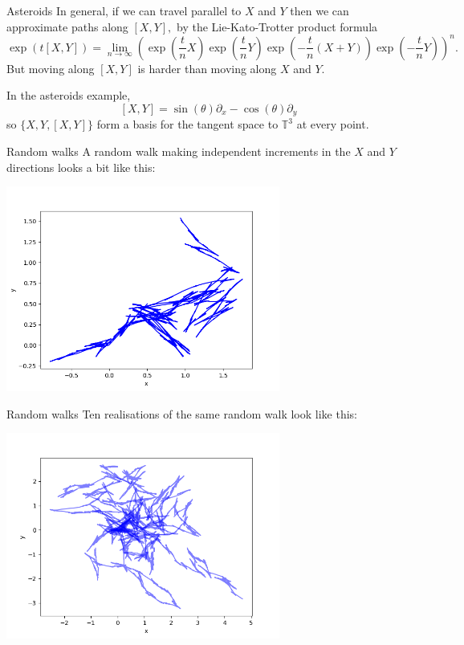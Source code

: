 \documentclass{beamer}
\numberwithin{equation}{section}
\theoremstyle{plain}
\theoremstyle{plain}
\theoremstyle{definition}
\theoremstyle{plain}
\theoremstyle{plain}
\theoremstyle{definition}
\newcommand{\Itgr}{\mathbb{Z}}
\newcommand{\Circ}{\mathbb{T}}
\begin{document}
\begin{frame}{Asteroids}
  In general, if we can travel parallel to $X$ and $Y$ then we can approximate paths along $[X,Y],$ by the Lie-Kato-Trotter product formula
  \[
    \exp(t[X,Y]) = \lim_{n\to\infty} (\exp(\frac{t}{n}X)\exp(\frac{t}{n}Y)\exp(-\frac{t}{n}(X+Y))\exp(-\frac{t}{n}Y))^n.
  \]
  But moving along $[X,Y]$ is harder than moving along $X$ and $Y.$

  In the asteroids example,
  \[
    [X,Y] = \sin(\theta)\partial_x-\cos(\theta)\partial_y
  \]
  so $\{X,Y,[X,Y]\}$ form a basis for the tangent space to $\Circ^3$ at every point.
\end{frame}

\begin{frame}{Random walks}
  A random walk making independent increments in the $X$ and $Y$ directions looks a bit like this:
  \begin{center}
  \includegraphics[width=90mm]{xy_coords_single_paths.png}
  \end{center}
\end{frame}

\begin{frame}{Random walks}
  Ten realisations of the same random walk look like this:
  \begin{center}
    \includegraphics[width=90mm]{xy_coords_multiple_paths.png}
  \end{center}
\end{frame}
\end{document}
